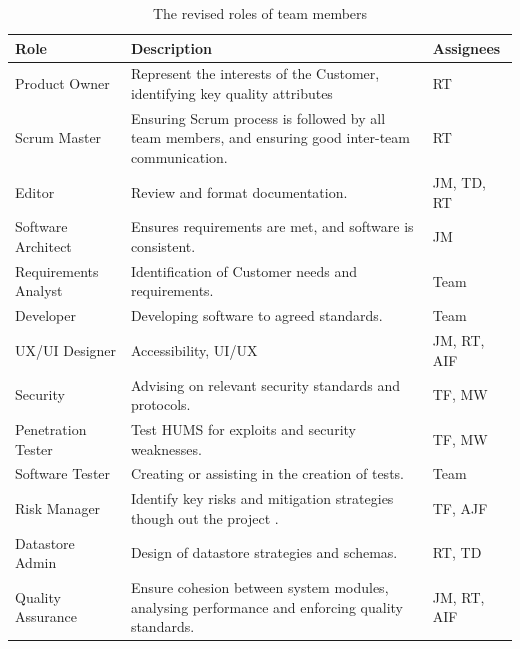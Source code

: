 \begin{table}[H]
\begin{tabular}{ | p{3.5cm} | p{8.5cm} | p{2cm} |}
\hline
\rowcolor{titleColor}\textbf{Role}
&  \textbf{Description} 
& \textbf{Assignees} \\ \hline

Product Owner & Represent the interests of the Customer, identifying key quality attributes & RT \\ \hline

Scrum Master  &   Ensuring Scrum process is followed by all team members, and ensuring good inter-team communication.            		& RT           				\\ \hline
Editor  &   Review and format documentation. & JM, TD, RT \\ \hline

Software Architect  &  Ensures requirements are met, and software is consistent. & JM \\ \hline

Requirements Analyst  &   Identification of Customer needs and requirements.  & Team \\ \hline

Developer &   Developing software to agreed standards. &  Team     \\ \hline

UX/UI Designer    &   Accessibility, UI/UX	& JM, RT, AIF    \\ \hline

Security    &   Advising on relevant security standards and protocols. & TF, MW  \\ \hline

Penetration Tester & Test HUMS for exploits and security weaknesses. &TF, MW \\ \hline

Software Tester &   Creating or assisting in the creation of tests. & Team  	 \\ \hline

Risk Manager &   Identify key risks and mitigation strategies though out the project .  & TF, AJF \\ \hline

Datastore Admin &   Design of datastore strategies and schemas. & RT, TD                   \\ \hline
Quality Assurance   &   Ensure cohesion between system modules, analysing performance and enforcing quality standards.  & JM, RT, AIF \\ \hline
\end{tabular}
\caption{The revised roles of team members}
\label{tab:roles}
\end{table}

